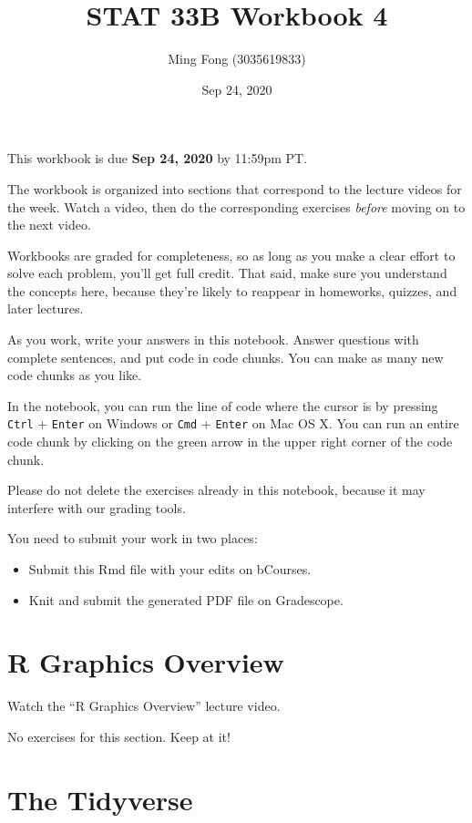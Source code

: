 \documentclass[
]{article}
\title{STAT 33B Workbook 4}
\author{Ming Fong (3035619833)}
\date{Sep 24, 2020}
\providecommand{\tightlist}{%
  \setlength{\itemsep}{0pt}\setlength{\parskip}{0pt}}
\begin{document}
\maketitle

This workbook is due \textbf{Sep 24, 2020} by 11:59pm PT.

The workbook is organized into sections that correspond to the lecture
videos for the week. Watch a video, then do the corresponding exercises
\emph{before} moving on to the next video.

Workbooks are graded for completeness, so as long as you make a clear
effort to solve each problem, you'll get full credit. That said, make
sure you understand the concepts here, because they're likely to
reappear in homeworks, quizzes, and later lectures.

As you work, write your answers in this notebook. Answer questions with
complete sentences, and put code in code chunks. You can make as many
new code chunks as you like.

In the notebook, you can run the line of code where the cursor is by
pressing \texttt{Ctrl} + \texttt{Enter} on Windows or \texttt{Cmd} +
\texttt{Enter} on Mac OS X. You can run an entire code chunk by clicking
on the green arrow in the upper right corner of the code chunk.

Please do not delete the exercises already in this notebook, because it
may interfere with our grading tools.

You need to submit your work in two places:

\begin{itemize}
\tightlist
\item
  Submit this Rmd file with your edits on bCourses.
\item
  Knit and submit the generated PDF file on Gradescope.
\end{itemize}

\hypertarget{r-graphics-overview}{%
\section{R Graphics Overview}\label{r-graphics-overview}}

Watch the ``R Graphics Overview'' lecture video.

No exercises for this section. Keep at it!

\hypertarget{the-tidyverse}{%
\section{The Tidyverse}\label{the-tidyverse}}
\end{document}
